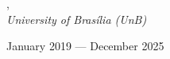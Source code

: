 , \\  
\textit{University of Brasília (UnB)}\strut \hfill January 2019 --- December 2025\\  

\vspace*{7pt}  


